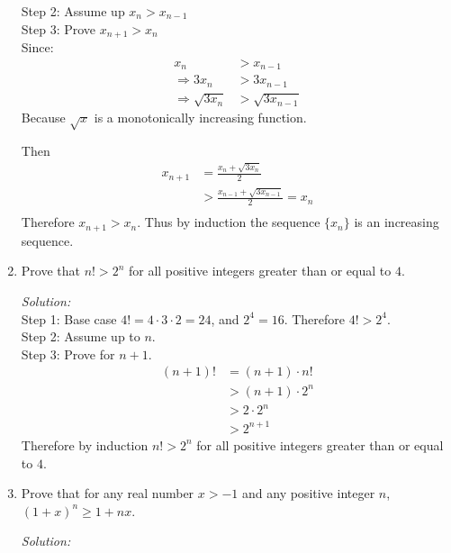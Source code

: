 \documentclass[12pt]{article}
\theoremstyle{remark}
\begin{document}
\begin{enumerate}
\begin{mdframed}[style=TheoremFrame]
Step 2: Assume up $x_n > x_{n-1}$\\

Step 3: Prove $x_{n+1} > x_n$\\

Since: 
\begin{align*}
x_n &> x_{n-1}\\
\Rightarrow 3x_n &> 3x_{n-1}\\
\Rightarrow \sqrt{3x_n} &> \sqrt{3x_{n-1}}
\end{align*}
Because $\sqrt{x}$ is a monotonically increasing function.

Then
\begin{align*}
x_{n+1} &= \frac{x_n +  \sqrt{3x_n}}{2}\\
&> \frac{x_{n-1} +  \sqrt{3x_{n-1}}}{2} = x_n\\
\end{align*}
Therefore $x_{n+1} > x_n$. Thus by induction the sequence $\{ x_n \}$ is an increasing sequence.
\end{mdframed}
\newpage
\item Prove that $n! > 2^n$ for all positive integers greater than or equal to $4$. 

\begin{mdframed}[style=TheoremFrame]
\textit{Solution:}\\

Step 1: Base case $4! = 4 \cdot 3 \cdot 2 = 24$, and $2^4 = 16$. Therefore $4! > 2^4$.\\

Step 2: Assume up to $n$.\\

Step 3: Prove for $n+1$.\\

\begin{align*}
(n+1)! &= (n+1)\cdot n!\\
&> (n+1)\cdot 2^n\\
&> 2 \cdot 2^n\\
&> 2^{n+1}
\end{align*}
Therefore by induction $n! > 2^n$ for all positive integers greater than or equal to $4$. 
\end{mdframed}
\newpage
\item Prove that for any real number $x>-1$ and any positive integer $n$,\\ $(1+x)^n \geq 1 + nx$.
\begin{mdframed}[style=TheoremFrame]
\textit{Solution:}\\


\end{mdframed}
\end{enumerate}
\end{document}
